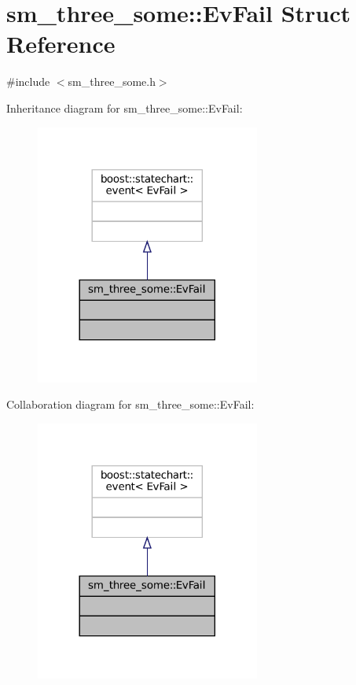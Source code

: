 \hypertarget{structsm__three__some_1_1EvFail}{}\section{sm\+\_\+three\+\_\+some\+:\+:Ev\+Fail Struct Reference}
\label{structsm__three__some_1_1EvFail}


{\ttfamily \#include $<$sm\+\_\+three\+\_\+some.\+h$>$}



Inheritance diagram for sm\+\_\+three\+\_\+some\+:\+:Ev\+Fail\+:
\nopagebreak
\begin{figure}[H]
\begin{center}
\leavevmode
\includegraphics[width=209pt]{structsm__three__some_1_1EvFail__inherit__graph}
\end{center}
\end{figure}


Collaboration diagram for sm\+\_\+three\+\_\+some\+:\+:Ev\+Fail\+:
\nopagebreak
\begin{figure}[H]
\begin{center}
\leavevmode
\includegraphics[width=209pt]{structsm__three__some_1_1EvFail__coll__graph}
\end{center}
\end{figure}


